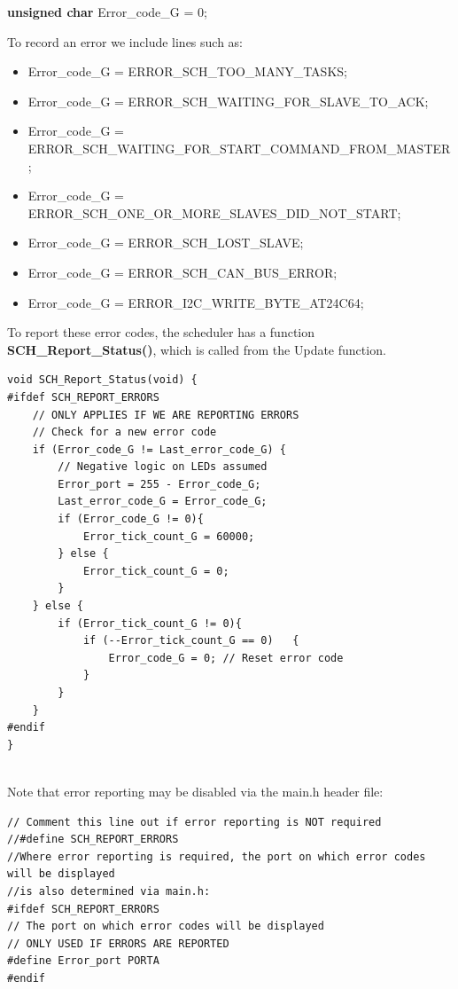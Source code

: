 \documentclass[twoside, final]{hcmut_report}
\begin{document}
\textbf{unsigned char} Error\_code\_G = 0;

To record an error we include lines such as:
\begin{itemize}
   \item Error\_code\_G = ERROR\_SCH\_TOO\_MANY\_TASKS;
    \item Error\_code\_G = ERROR\_SCH\_WAITING\_FOR\_SLAVE\_TO\_ACK;
    \item Error\_code\_G = ERROR\_SCH\_WAITING\_FOR\_START\_COMMAND\_FROM\_MASTER;
    \item Error\_code\_G = ERROR\_SCH\_ONE\_OR\_MORE\_SLAVES\_DID\_NOT\_START;
    \item Error\_code\_G = ERROR\_SCH\_LOST\_SLAVE;
    \item Error\_code\_G = ERROR\_SCH\_CAN\_BUS\_ERROR;
    \item Error\_code\_G = ERROR\_I2C\_WRITE\_BYTE\_AT24C64;
\end{itemize}
To report these error codes, the scheduler has a function \textbf{SCH\_Report\_Status()},
which is called from the Update function.

\begin{lstlisting}[basicstyle=\small, caption=An implementation of the ‘report status’ function]
void SCH_Report_Status(void) {
#ifdef SCH_REPORT_ERRORS
    // ONLY APPLIES IF WE ARE REPORTING ERRORS
    // Check for a new error code
    if (Error_code_G != Last_error_code_G) {
        // Negative logic on LEDs assumed
        Error_port = 255 - Error_code_G;
        Last_error_code_G = Error_code_G;
        if (Error_code_G != 0){
            Error_tick_count_G = 60000;
        } else {
            Error_tick_count_G = 0;
        } 
    } else {
        if (Error_tick_count_G != 0){
            if (--Error_tick_count_G == 0)   {
                Error_code_G = 0; // Reset error code
            }    
        } 
    }
#endif
}


\end{lstlisting}

Note that error reporting may be disabled via the main.h header file:
\begin{lstlisting}[basicstyle=\small, caption=Define a constant to allow errors are reported]
// Comment this line out if error reporting is NOT required
//#define SCH_REPORT_ERRORS
//Where error reporting is required, the port on which error codes will be displayed
//is also determined via main.h:
#ifdef SCH_REPORT_ERRORS
// The port on which error codes will be displayed
// ONLY USED IF ERRORS ARE REPORTED
#define Error_port PORTA
#endif

\end{lstlisting}
\end{document}
